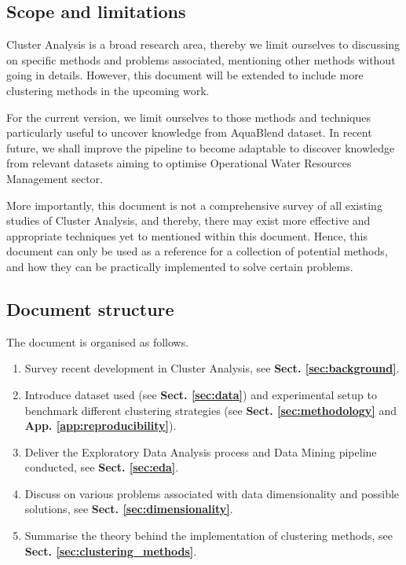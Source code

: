 \subsection{Scope and limitations}
\label{sec:introduction:scope}
Cluster Analysis is a broad research area, thereby we limit ourselves to discussing on specific methods and problems associated, mentioning other methods without going in details.
However, this document will be extended to include more clustering methods in the upcoming work.

For the current version, we limit ourselves to those methods and techniques particularly useful to uncover knowledge from AquaBlend dataset.
In recent future, we shall improve the pipeline to become adaptable to discover knowledge from relevant datasets aiming to optimise Operational Water Resources Management sector.

More importantly, this document is not a comprehensive survey of all existing studies of Cluster Analysis, and thereby, there may exist more effective and appropriate techniques yet to mentioned within this document.
Hence, this document can only be used as a reference for a collection of potential methods, and how they can be practically implemented to solve certain problems.

\subsection{Document structure}
\label{sec:introduction:structure}

The document is organised as follows.
\begin{enumerate}
  \item Survey recent development in Cluster Analysis, see \textbf{Sect. \ref{sec:background}}.
  \item Introduce dataset used (see \textbf{Sect. \ref{sec:data}}) and experimental setup to benchmark different clustering strategies (see \textbf{Sect. \ref{sec:methodology}} and \textbf{App. \ref{app:reproducibility}}).
  \item Deliver the Exploratory Data Analysis process and Data Mining pipeline conducted, see \textbf{Sect. \ref{sec:eda}}.
  \item Discuss on various problems associated with data dimensionality and possible solutions, see \textbf{Sect. \ref{sec:dimensionality}}.
  \item Summarise the theory behind the implementation of clustering methods, see \textbf{Sect. \ref{sec:clustering_methods}}.
\end{enumerate}